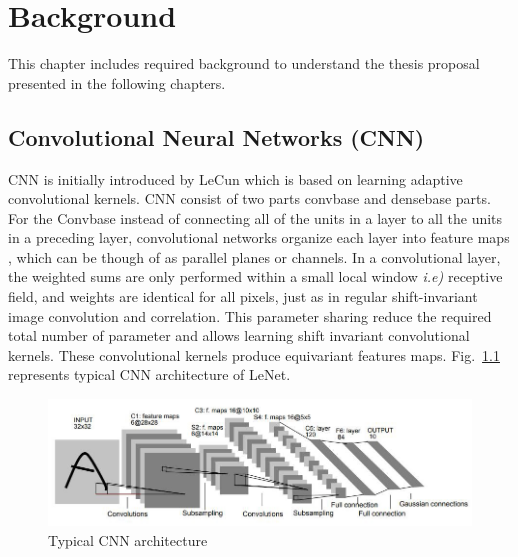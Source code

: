
\chapter{Background} %

\label{chp:background} %

This chapter includes required background to understand the thesis proposal presented in the following chapters.

\section{Convolutional Neural Networks (CNN)}

CNN is initially introduced by LeCun \cite{lecun1989handwritten} which is based on learning adaptive convolutional kernels. CNN consist of two parts convbase and densebase parts. For the Convbase instead of connecting all of the units in a layer to all the units in a preceding layer, convolutional networks organize each layer into feature maps \cite{lecun1989handwritten}, which
can be though of as parallel planes or channels. In a convolutional layer, the weighted sums are only performed within a small local window \textit{i.e)} receptive field, and weights are identical for all pixels, just as in regular shift-invariant image convolution and correlation. This parameter sharing reduce the required total number of parameter and allows learning shift invariant convolutional kernels. These convolutional kernels produce equivariant features maps. Fig.~\ref{lenet} represents typical CNN architecture of LeNet.
\begin{figure}
    \begin{center}
        \includegraphics[width=\textwidth]{Figures/LeNetCNN.jpeg}
        \caption{Typical CNN architecture}
        \label{lenet}
    \end{center}
\end{figure}
